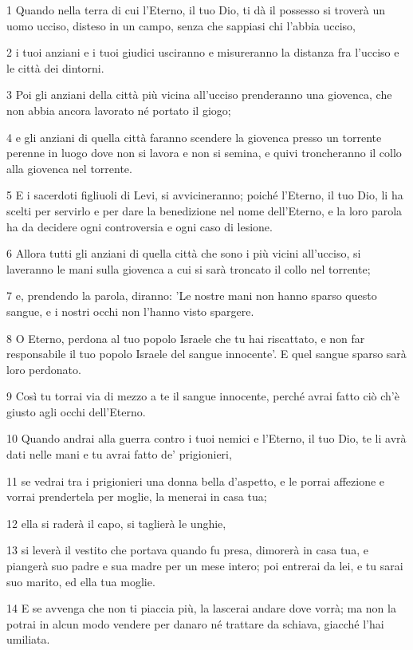 \par 1 Quando nella terra di cui l'Eterno, il tuo Dio, ti dà il possesso si troverà un uomo ucciso, disteso in un campo, senza che sappiasi chi l'abbia ucciso,
\par 2 i tuoi anziani e i tuoi giudici usciranno e misureranno la distanza fra l'ucciso e le città dei dintorni.
\par 3 Poi gli anziani della città più vicina all'ucciso prenderanno una giovenca, che non abbia ancora lavorato né portato il giogo;
\par 4 e gli anziani di quella città faranno scendere la giovenca presso un torrente perenne in luogo dove non si lavora e non si semina, e quivi troncheranno il collo alla giovenca nel torrente.
\par 5 E i sacerdoti figliuoli di Levi, si avvicineranno; poiché l'Eterno, il tuo Dio, li ha scelti per servirlo e per dare la benedizione nel nome dell'Eterno, e la loro parola ha da decidere ogni controversia e ogni caso di lesione.
\par 6 Allora tutti gli anziani di quella città che sono i più vicini all'ucciso, si laveranno le mani sulla giovenca a cui si sarà troncato il collo nel torrente;
\par 7 e, prendendo la parola, diranno: 'Le nostre mani non hanno sparso questo sangue, e i nostri occhi non l'hanno visto spargere.
\par 8 O Eterno, perdona al tuo popolo Israele che tu hai riscattato, e non far responsabile il tuo popolo Israele del sangue innocente'. E quel sangue sparso sarà loro perdonato.
\par 9 Così tu torrai via di mezzo a te il sangue innocente, perché avrai fatto ciò ch'è giusto agli occhi dell'Eterno.
\par 10 Quando andrai alla guerra contro i tuoi nemici e l'Eterno, il tuo Dio, te li avrà dati nelle mani e tu avrai fatto de' prigionieri,
\par 11 se vedrai tra i prigionieri una donna bella d'aspetto, e le porrai affezione e vorrai prendertela per moglie, la menerai in casa tua;
\par 12 ella si raderà il capo, si taglierà le unghie,
\par 13 si leverà il vestito che portava quando fu presa, dimorerà in casa tua, e piangerà suo padre e sua madre per un mese intero; poi entrerai da lei, e tu sarai suo marito, ed ella tua moglie.
\par 14 E se avvenga che non ti piaccia più, la lascerai andare dove vorrà; ma non la potrai in alcun modo vendere per danaro né trattare da schiava, giacché l'hai umiliata.
